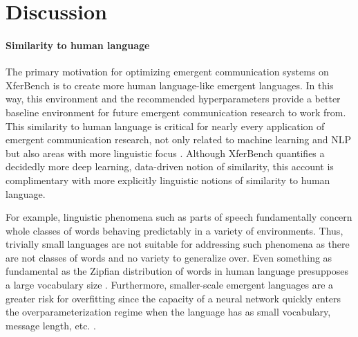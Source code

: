 \section{Discussion}
\unskip\label{hpo:sec:discussion}


\paragraph{Similarity to human language}
The primary motivation for optimizing emergent communication systems on XferBench is to create more human language-like emergent languages.
In this way, this environment and the recommended hyperparameters provide a better baseline environment for future emergent communication research to work from.
This similarity to human language is critical for nearly every application of emergent communication research, not only related to machine learning and NLP but also areas with more linguistic focus \citep{boldt2024review}.
Although XferBench quantifies a decidedly more deep learning, data-driven notion of similarity, this account is complimentary with more explicitly linguistic notions of similarity to human language.

For example, linguistic phenomena such as parts of speech fundamentally concern whole classes of words behaving predictably in a variety of environments.
Thus, trivially small languages are not suitable for addressing such phenomena as there are not classes of words and no variety to generalize over.
Even something as fundamental as the Zipfian distribution of words in human language presupposes a large vocabulary size \citep{zipf,piantadosi2014zipf}.
Furthermore, smaller-scale emergent languages are a greater risk for overfitting since the capacity of a neural network quickly enters the overparameterization regime when the language has as small vocabulary, message length, etc. \citep{gupta-etal-2020-compositionality}.


